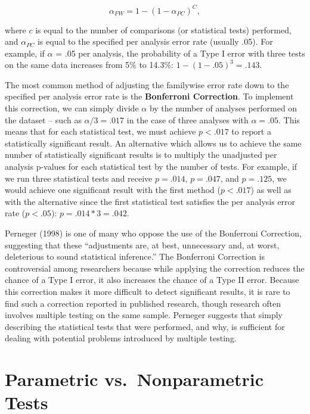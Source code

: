 \documentclass[]{book}
\begin{document}
\[ \alpha_{FW} = 1 - (1 - \alpha_{PC})^C,  \]

where \(c\) is equal to the number of comparisons (or statistical tests) performed, and \(\alpha_{PC}\) is equal to the specified per analysis error rate (usually .05). For example, if \(\alpha\) = .05 per analysis, the probability of a Type I error with three tests on the same data increases from 5\% to 14.3\%: \(1 - (1 - .05)^3 = .143\).

The most common method of adjusting the familywise error rate down to the specified per analysis error rate is the \textbf{Bonferroni Correction}. To implement this correction, we can simply divide \(\alpha\) by the number of analyses performed on the dataset -- such as \(\alpha / 3 = .017\) in the case of three analyses with \(\alpha = .05\). This means that for each statistical test, we must achieve \(p < .017\) to report a statistically significant result. An alternative which allows us to achieve the same number of statistically significant results is to multiply the unadjusted per analysis p-values for each statistical test by the number of tests. For example, if we run three statistical tests and receive \(p = .014\), \(p = .047\), and \(p = .125\), we would achieve one significant result with the first method (\(p < .017\)) as well as with the alternative since the first statistical test satisfies the per analysis error rate (\(p < .05\)): \(p = .014 * 3 = .042\).

Perneger (1998) is one of many who oppose the use of the Bonferroni Correction, suggesting that these ``adjustments are, at best, unnecessary and, at worst, deleterious to sound statistical inference.'' The Bonferroni Correction is controversial among researchers because while applying the correction reduces the chance of a Type I error, it also increases the chance of a Type II error. Because this correction makes it more difficult to detect significant results, it is rare to find such a correction reported in published research, though research often involves multiple testing on the same sample. Perneger suggests that simply describing the statistical tests that were performed, and why, is sufficient for dealing with potential problems introduced by multiple testing.

\hypertarget{parametric-vs.nonparametric-tests}{%
\section{Parametric vs.~Nonparametric Tests}\label{parametric-vs.nonparametric-tests}}
\end{document}
